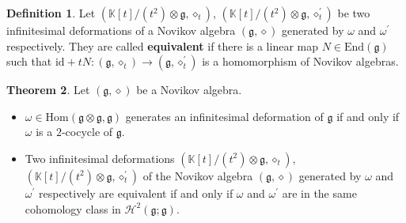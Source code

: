 \documentclass[12pt]{amsart}
\theoremstyle{definition}
\newtheorem{thm}{Theorem}[section]
\newtheorem{defi}[thm]{Definition}
\newcommand{\g}{\mathfrak g}
\newcommand{\huaH}{\mathcal{H}}
\newcommand{\id}{\mathrm{id}}
\newcommand{\Hom}{\mathrm{Hom}}
\newcommand{\End}{\mathrm{End}}
\newcommand{\ot}{\otimes}
\newcommand{\ome}{\omega}
\begin{document}
\begin{defi}
Let $(\mathds{K}[t]/(t^2)\ot\g, \diamond_t)$, $(\mathds{K}[t]/(t^2)\ot\g, \diamond_t^{\prime})$ be two infinitesimal deformations of a Novikov algebra $(\g,\diamond)$ generated by $\ome$ and $\ome^{\prime}$ respectively.  They are called \textbf{equivalent} if there is a linear map $N\in\End(\g)$ such that $\id+tN:(\g,\diamond_t)\to (\g,\diamond_t^{\prime})$ is a homomorphism of Novikov algebras.
\end{defi}

\begin{thm}\label{deformation-2-cocycle}
	Let $(\g, \diamond)$ be a Novikov algebra.
\begin{itemize}
\item[{\rm (i)}]  $\ome\in\Hom(\g\otimes\g,\g)$ generates an infinitesimal deformation of $\g$ if and only if $\ome$ is a $2$-cocycle of $\g$.
\item[{\rm (ii)}] Two infinitesimal deformations $(\mathds{K}[t]/(t^2)\ot\g, \diamond_t)$, $(\mathds{K}[t]/(t^2)\ot\g, \diamond_t^{\prime})$ of the Novikov algebra $(\g,\diamond)$ generated by $\ome$ and $\ome^{\prime}$ respectively are equivalent if and only if  $\ome$ and $\ome^{\prime}$ are in the same cohomology class in  $\huaH^2(\g;\g)$.
\end{itemize}	
\end{thm}
\end{document}
